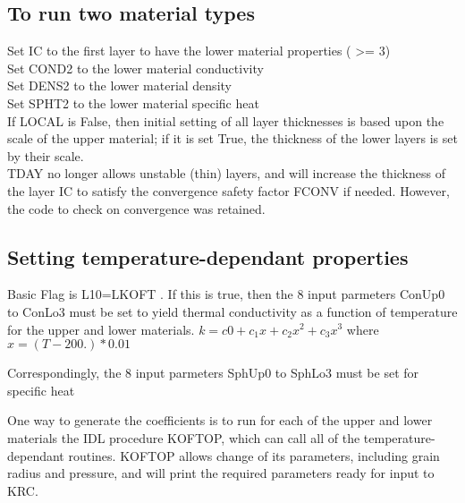 \documentclass[draft]{article}  %
\begin{document}
\subsection{ To run two material types } %

Set IC to the first layer to have the lower material properties ( >= 3) \\
Set COND2 to the lower material conductivity \\
Set DENS2 to the lower material density \\
Set SPHT2 to the lower material specific heat \\
If LOCAL is False, then initial setting of all layer thicknesses is based
upon the scale of the upper material; if it is set True, the thickness of the
lower layers is set by their scale. \\
  TDAY no longer allows unstable (thin) layers, and will increase the thickness
of the layer IC to satisfy the convergence safety factor FCONV if needed. 
However, the code to check on convergence was retained.

\subsection{Setting temperature-dependant properties} %

Basic Flag is L10=LKOFT . If this is true, then the 8 input parmeters ConUp0 to
ConLo3 must be set to yield thermal conductivity as a function of temperature
for the upper and lower materials. $ k=c0 +c_1x + c_2x^2 +c_3x^3 $ where
$x=(T-200.)*0.01$ 

Correspondingly, the 8 input parmeters SphUp0 to SphLo3 must be set for specific
heat
 
One way to generate the coefficients is to run for each of the upper and lower
materials the IDL procedure KOFTOP, which can call all of the
temperature-dependant routines. KOFTOP allows change of its parameters,
including grain radius and pressure, and will print the required parameters
ready for input to KRC.
\end{document}
